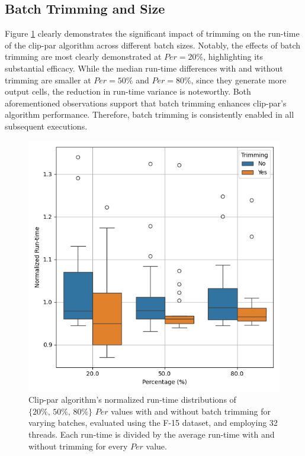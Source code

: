\documentclass{egpubl}
\begin{document}
\subsection{Batch Trimming and Size}
\label{sec:batch-size-and-trimming}
Figure \ref{fig:batch-trimming} clearly demonstrates the significant impact of trimming on the run-time of the clip-par algorithm across different batch sizes. Notably, the effects of batch trimming are most clearly demonstrated at $Per = 20\%$, highlighting its substantial efficacy. While the median run-time differences with and without trimming are smaller at $Per = 50\%$ and $Per = 80\%$, since they generate more output cells, the reduction in run-time variance is noteworthy. Both aforementioned observations support that batch trimming enhances clip-par's algorithm performance. Therefore, batch trimming is consistently enabled in all subsequent executions.


\begin{figure}[H]
    \centering
    \includegraphics[width=\linewidth]{./Figures/Batch-Trimming.png}
    \caption{Clip-par algorithm's normalized run-time distributions of $\textit{\{20\%, 50\%, 80\%\}}$ $Per$ values with and without batch trimming for varying batches, evaluated using the F-15 dataset, and employing 32 threads. Each run-time is divided by the average run-time with and without trimming for every $Per$ value.}
    \label{fig:batch-trimming}
\end{figure}
\end{document}
